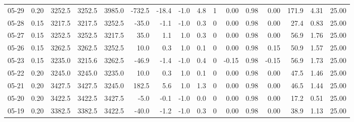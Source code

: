 \begin{threeparttable}
{\begin{tabular}{lrrrrrrrrrrrrrrr}
  05-29 &     0.20 & 3252.5 & 3252.5 & 3985.0 &     -732.5 &          -18.4 &                     -1.0 &                 4.8 &              1 &       0.00 &      0.98 &           0.00 &            171.9 &            4.31 &                  25.00 \\
  05-28 &     0.15 & 3217.5 & 3217.5 & 3252.5 &      -35.0 &           -1.1 &                     -1.0 &                 0.3 &              0 &       0.00 &      0.98 &           0.00 &             27.4 &            0.83 &                  25.00 \\
  05-27 &     0.15 & 3252.5 & 3252.5 & 3217.5 &       35.0 &            1.1 &                      1.0 &                 0.3 &              0 &       0.00 &      0.98 &           0.00 &             56.9 &            1.76 &                  25.00 \\
  05-26 &     0.15 & 3262.5 & 3262.5 & 3252.5 &       10.0 &            0.3 &                      1.0 &                 0.1 &              0 &       0.00 &      0.98 &           0.15 &             50.9 &            1.57 &                  25.00 \\
  05-23 &     0.15 & 3235.0 & 3215.6 & 3262.5 &      -46.9 &           -1.4 &                     -1.0 &                 0.4 &              0 &      -0.15 &      0.98 &          -0.15 &             56.9 &            1.73 &                  25.00 \\
  05-22 &     0.20 & 3245.0 & 3245.0 & 3235.0 &       10.0 &            0.3 &                      1.0 &                 0.1 &              0 &       0.00 &      0.98 &           0.00 &             47.5 &            1.46 &                  25.00 \\
  05-21 &     0.20 & 3427.5 & 3427.5 & 3245.0 &      182.5 &            5.6 &                      1.0 &                 1.3 &              0 &       0.00 &      0.98 &           0.00 &             46.5 &            1.44 &                  25.00 \\
  05-20 &     0.20 & 3422.5 & 3422.5 & 3427.5 &       -5.0 &           -0.1 &                     -1.0 &                 0.0 &              0 &       0.00 &      0.98 &           0.00 &             17.2 &            0.51 &                  25.00 \\
  05-19 &     0.20 & 3382.5 & 3382.5 & 3422.5 &      -40.0 &           -1.2 &                     -1.0 &                 0.3 &              0 &       0.00 &      0.98 &           0.00 &             38.9 &            1.13 &                  25.00 \\

\end{tabular}}
\end{threeparttable}
